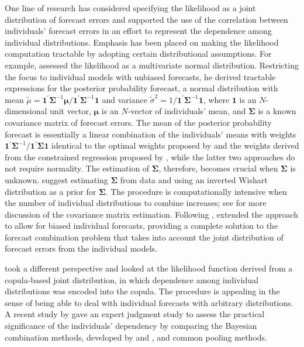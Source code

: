 \documentclass[11pt]{article}
\begin{document}
One line of research has considered specifying the likelihood as a joint distribution of forecast errors and supported the use of the correlation between individuals' forecast errors in an effort to represent the dependence among individual distributions. Emphasis has been placed on making the likelihood computation tractable by adopting certain distributional assumptions. For example, \cite{Winkler1981-bn} assessed the likelihood as a multivariate normal distribution. Restricting the focus to individual models with unbiased forecasts, he derived tractable expressions for the posterior probability forecast, a normal distribution with mean $\tilde{\mu} = \mathbf{1}^{\prime} \boldsymbol{\Sigma}^{-1} \boldsymbol{\mu} / \mathbf{1}^{\prime} \boldsymbol{\Sigma}^{-1} \mathbf{1}$ and variance $\tilde{\sigma}^{2} = 1/\mathbf{1}^{\prime} \boldsymbol{\Sigma}^{-1} \mathbf{1}$, where $\mathbf{1}$ is an $N$-dimensional unit vector, $\boldsymbol{\mu}$ is an $N$-vector of individuals' mean, and $\boldsymbol{\Sigma}$ is a known covariance matrix of forecast errors. The mean of the posterior probability forecast is essentially a linear combination of the individuals' means with weights $\mathbf{1}^{\prime} \boldsymbol{\Sigma}^{-1} / \mathbf{1}^{\prime} \boldsymbol{\Sigma} \mathbf{1}$ identical to the optimal weights proposed by \cite{Bates1969-yj} and the weights derived from the constrained regression proposed by \cite{Granger1984-jc}, while the latter two approaches do not require normality. The estimation of $\boldsymbol{\Sigma}$, therefore, becomes crucial when $\boldsymbol{\Sigma}$ is unknown. \cite{Winkler1981-bn} suggest estimating $\boldsymbol{\Sigma}$ from data and using an inverted Wishart distribution as a prior for $\boldsymbol{\Sigma}$. The procedure is computationally intensive when the number of individual distributions to combine increases; see \cite{Hall2004-tm} for more discussion of the covariance matrix estimation. Following \cite{Winkler1981-bn}, \cite{Palm1992-im} extended the approach to allow for biased individual forecasts, providing a complete solution to the forecast combination problem that takes into account the joint distribution of forecast errors from the individual models.

\cite{Jouini1996-fe} took a different perspective and looked at the likelihood function derived from a copula-based joint distribution, in which dependence among individual distributions was encoded into the copula. The procedure is appealing in the sense of being able to deal with individual forecasts with arbitrary distributions. A recent study by \cite{Wilson2017-ct} gave an expert judgment study to assess the practical significance of the individuals' dependency by comparing the Bayesian combination methods, developed by \cite{Winkler1981-bn} and \cite{Jouini1996-fe}, and common pooling methods.
\end{document}
